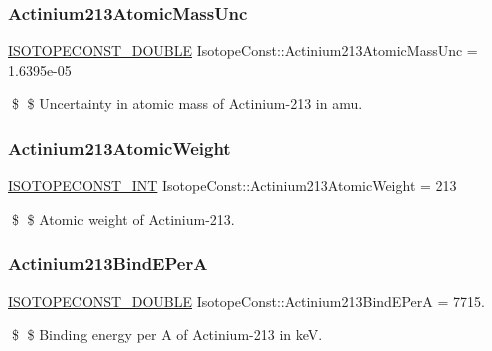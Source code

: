 \subsubsection{\texorpdfstring{Actinium213\+Atomic\+Mass\+Unc}{Actinium213AtomicMassUnc}}
{\footnotesize\ttfamily \mbox{\hyperlink{group___isotope_const-_macros_ga8f45a7272ce02c0b4c65c44636ed719a}{I\+S\+O\+T\+O\+P\+E\+C\+O\+N\+S\+T\+\_\+\+D\+O\+U\+B\+LE}} Isotope\+Const\+::\+Actinium213\+Atomic\+Mass\+Unc = 1.\+6395e-\/05}

\$ \$ Uncertainty in atomic mass of Actinium-\/213 in amu. \mbox{\label{group___isotope_const-_actinium-_ac213_ga34454a1e62c926379cbd33451686a552}} 
\subsubsection{\texorpdfstring{Actinium213\+Atomic\+Weight}{Actinium213AtomicWeight}}
{\footnotesize\ttfamily \mbox{\hyperlink{group___isotope_const-_macros_ga5f18360b3e99483a35c32d789e62621c}{I\+S\+O\+T\+O\+P\+E\+C\+O\+N\+S\+T\+\_\+\+I\+NT}} Isotope\+Const\+::\+Actinium213\+Atomic\+Weight = 213}

\$ \$ Atomic weight of Actinium-\/213. \mbox{\label{group___isotope_const-_actinium-_ac213_ga0facaa79e35fb15608f119917336676d}} 
\subsubsection{\texorpdfstring{Actinium213\+Bind\+E\+PerA}{Actinium213BindEPerA}}
{\footnotesize\ttfamily \mbox{\hyperlink{group___isotope_const-_macros_ga8f45a7272ce02c0b4c65c44636ed719a}{I\+S\+O\+T\+O\+P\+E\+C\+O\+N\+S\+T\+\_\+\+D\+O\+U\+B\+LE}} Isotope\+Const\+::\+Actinium213\+Bind\+E\+PerA = 7715.}

\$ \$ Binding energy per A of Actinium-\/213 in keV. \mbox{\label{group___isotope_const-_actinium-_ac213_gac8ec63fe75db6d3db57b79e41b733e8a}} 
